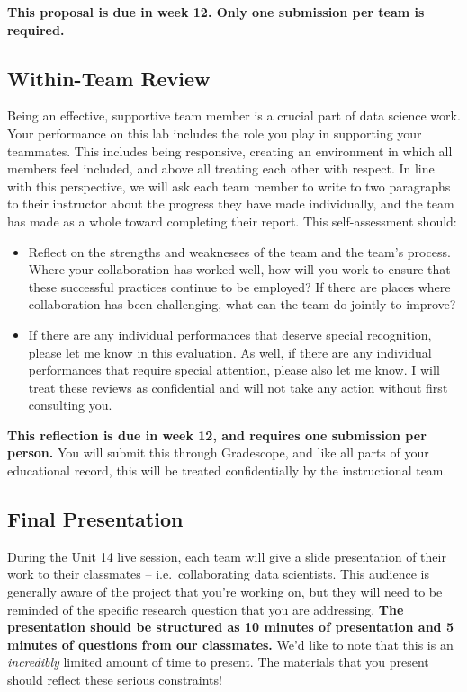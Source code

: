 \documentclass[
]{article}
\providecommand{\tightlist}{%
  \setlength{\itemsep}{0pt}\setlength{\parskip}{0pt}}
\begin{document}
\textbf{This proposal is due in week 12. Only one submission per team is
required.}

\hypertarget{within-team-review}{%
\subsection{Within-Team Review}\label{within-team-review}}

Being an effective, supportive team member is a crucial part of data
science work. Your performance on this lab includes the role you play in
supporting your teammates. This includes being responsive, creating an
environment in which all members feel included, and above all treating
each other with respect. In line with this perspective, we will ask each
team member to write to two paragraphs to their instructor about the
progress they have made individually, and the team has made as a whole
toward completing their report. This self-assessment should:

\begin{itemize}
\tightlist
\item
  Reflect on the strengths and weaknesses of the team and the team's
  process. Where your collaboration has worked well, how will you work
  to ensure that these successful practices continue to be employed? If
  there are places where collaboration has been challenging, what can
  the team do jointly to improve?
\item
  If there are any individual performances that deserve special
  recognition, please let me know in this evaluation. As well, if there
  are any individual performances that require special attention, please
  also let me know. I will treat these reviews as confidential and will
  not take any action without first consulting you.
\end{itemize}

\textbf{This reflection is due in week 12, and requires one submission
per person.} You will submit this through Gradescope, and like all parts
of your educational record, this will be treated confidentially by the
instructional team.

\hypertarget{final-presentation}{%
\subsection{Final Presentation}\label{final-presentation}}

During the Unit 14 live session, each team will give a slide
presentation of their work to their classmates -- i.e.~collaborating
data scientists. This audience is generally aware of the project that
you're working on, but they will need to be reminded of the specific
research question that you are addressing. \textbf{The presentation
should be structured as 10 minutes of presentation and 5 minutes of
questions from our classmates.} We'd like to note that this is an
\emph{incredibly} limited amount of time to present. The materials that
you present should reflect these serious constraints!
\end{document}
